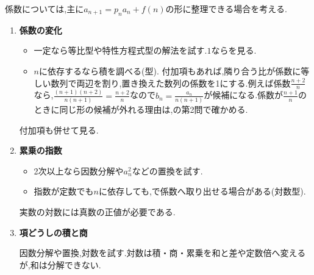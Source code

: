  \medskip

  係数については,主に$a_{n+1}=p_na_n+f(n)$の形に整理できる場合を考える.
  \begin{enumerate}
    \item \textbf{係数の変化}

      \begin{itemize}[beginpenalty=10000]
        \item 一定なら等比型や特性方程式型の解法を試す.$1$ならを見る.
        \item $n$に依存するなら積を調べる(型).
          付加項もあれば,隣り合う比が係数に等しい数列で両辺を割り,置き換えた数列の係数を1にする.例えば係数$\frac{n+2}{n}$なら,$\frac{(n+1)(n+2)}{n(n+1)}=\frac{n+2}{n}$なので$b_n=\frac{a_n}{n(n+1)}$が候補になる.係数が$\frac{n+1}{n}$のときに同じ形の候補が外れる理由は,の第2問で確かめる.
      \end{itemize}
      付加項も併せて見る.

    \item \textbf{累乗の指数}

      \begin{itemize}[beginpenalty=10000]
        \item 2次以上なら因数分解や$a_n^2$などの置換を試す.
        \item 指数が定数でも$n$に依存しても,で係数へ取り出せる場合がある(対数型).
      \end{itemize}
      実数の対数には真数の正値が必要である.

    \item \textbf{項どうしの積と商}

      因数分解や置換,対数を試す.対数は積・商・累乗を和と差や定数倍へ変えるが,和は分解できない.
  \end{enumerate}

  \medskip

